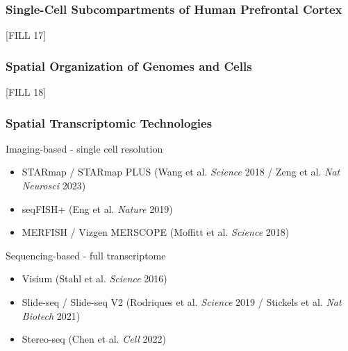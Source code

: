 \documentclass[10pt]{article}
\begin{document}
\subsubsection*{Single-Cell Subcompartments of Human Prefrontal Cortex}
[FILL 17]

\subsubsection*{Spatial Organization of Genomes and Cells}
[FILL 18]

\subsubsection*{Spatial Transcriptomic Technologies}
Imaging-based - single cell resolution
\begin{itemize}
	\item STARmap / STARmap PLUS (Wang et al. \textit{Science} 2018 / Zeng et al. \textit{Nat Neurosci} 2023)
	\item seqFISH+ (Eng et al. \textit{Nature} 2019)
	\item MERFISH / Vizgen MERSCOPE (Moffitt et al. \textit{Science} 2018)
\end{itemize}
Sequencing-based - full transcriptome
\begin{itemize}
	\item Visium (Stahl et al. \textit{Science} 2016)
	\item Slide-seq / Slide-seq V2 (Rodriques et al. \textit{Science} 2019 / Stickels et al. \textit{Nat Biotech} 2021)
	\item Stereo-seq (Chen et al. \textit{Cell} 2022)
\end{itemize}
\end{document}
